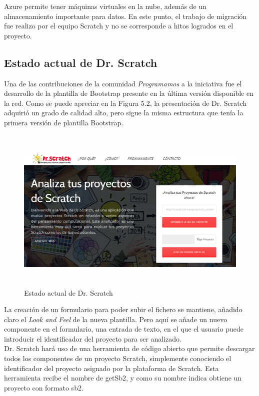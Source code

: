 \documentclass[a4paper, 12pt]{book}
\begin{document}
Azure permite tener máquinas virtuales en la nube, además de un almacenamiento importante
para datos. En este punto, el trabajo de migración fue realizo por el equipo Scratch y no
se corresponde a hitos logrados en el proyecto.


\subsection{Estado actual de Dr. Scratch}


Una de las contribuciones de la comunidad \emph{Programamos} a la iniciativa fue el 
desarrollo de la plantilla de Bootstrap presente en la última versión disponible en
la red. Como se puede apreciar en la Figura 5.2, la presentación de Dr. Scratch
adquirió un grado de calidad alto, pero sigue la misma estructura que tenía la primera
versión de plantilla Bootstrap. \\

\begin{figure}[h]
	\centering
	\graphicspath{{img/}}
  \includegraphics[bb=0 0 800 600, width=18cm, height=8cm, keepaspectratio]{drscratchactual.png}
	\caption{Estado actual de Dr. Scratch}
  \label{figura:foro_hilos}
\end{figure}

La creación de un formulario para poder subir el fichero se mantiene, añadido claro
el \emph{Look and Feel} de la nueva plantilla. Pero aquí se añade un nuevo componente
en el formulario, una entrada de texto, en el que el usuario puede introducir el 
identificador del proyecto para ser analizado. \\

Dr. Scratch hará uso de una herramienta de código abierto que permite descargar todos
los componentes de un proyecto Scratch, simplemente conociendo el identificador del
proyecto asignado por la plataforma de Scratch. Esta herramienta recibe el nombre de
getSb2, y como su nombre indica obtiene un proyecto con formato sb2. \\
\end{document}
